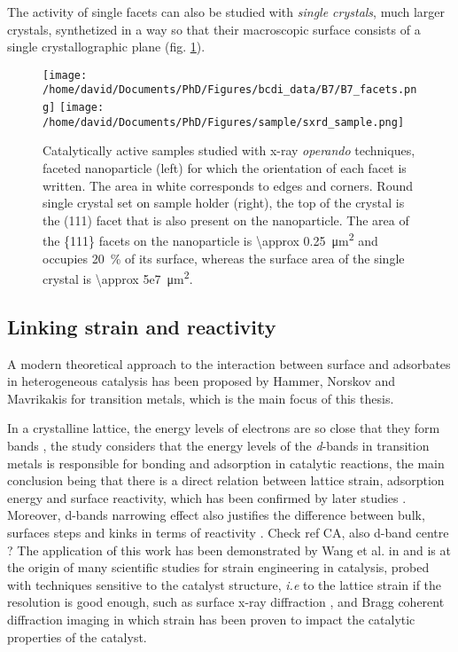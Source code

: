 The activity of single facets can also be studied with \textit{single crystals}, much larger crystals, synthetized in a way so that their macroscopic surface consists of a single crystallographic plane (fig. \ref{fig:Samples}).

\begin{figure}[!htb]
    \centering
    \texttt{[image: /home/david/Documents/PhD/Figures/bcdi\_data/B7/B7\_facets.png]}
    \texttt{[image: /home/david/Documents/PhD/Figures/sample/sxrd\_sample.png]}
    \caption{
        Catalytically active samples studied with x-ray \textit{operando} techniques, faceted nanoparticle (left) for which the orientation of each facet is written.
        The area in white corresponds to edges and corners.
        Round single crystal set on sample holder (right), the top of the crystal is the (111) facet that is also present on the nanoparticle.
        The area of the \{111\} facets on the nanoparticle is \qty{\approx 0.25}{\um^2} and occupies \qty{20}{\percent} of its surface, whereas the surface area of the single crystal is \qty{\approx 5e7}{\um^2}.
    }
    \label{fig:Samples}
\end{figure}

\subsection{Linking strain and reactivity}

A modern theoretical approach to the interaction between surface and adsorbates in heterogeneous catalysis has been proposed by Hammer, Norskov and Mavrikakis \parencite*{Hammer1995, Mavrikakis1998, Hammer2000} for transition metals, which is the main focus of this thesis.

In a crystalline lattice, the energy levels of electrons are so close that they form bands \parencite{Ashcroft76}, the study considers that the energy levels of the \textit{d}-bands in transition metals is responsible for bonding and adsorption in catalytic reactions, the main conclusion being that there is a direct relation between lattice strain, adsorption energy and surface reactivity, which has been confirmed by later studies \parencite{Kitchin2004, Kibler2005, Ontaneda2015}.
Moreover, d-bands narrowing effect also justifies the difference between bulk, surfaces steps and kinks in terms of reactivity \parencite{Haydock1972, DESJONQUERES1975, EGELHOFF1987, Hammer2006}.
\textcolor{Important}{Check ref CA, also d-band centre ?}
The application of this work has been demonstrated by Wang et al. in \cite*{Wang2016} and is at the origin of many scientific studies for strain engineering in catalysis, probed with techniques sensitive to the catalyst structure, \textit{i.e} to the lattice strain if the resolution is good enough, such as surface x-ray diffraction \parencite{Resta2020a}, and Bragg coherent diffraction imaging \parencite{Sneed2015, ulvestad_situ_2016, Kim2019, Bjorling2019, Passos2020, Carnis2021a, Carnis2021b, Dupraz2022} in which strain has been proven to impact the catalytic properties of the catalyst.

